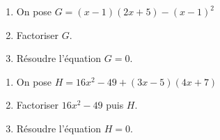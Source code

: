 \begin{multicols}{2}
    \begin{enumerate}
        \item On pose $G=(x-1)(2x+5)-(x-1)^2$
        \item Factoriser $G$.
        \item Résoudre l'équation $G=0$.
    \end{enumerate}

    \begin{enumerate}
        \item On pose $H=16x^2-49+(3x-5)(4x+7)$
        \item Factoriser $16x^2-49$ puis $H$.
        \item Résoudre l'équation $H=0$.
    \end{enumerate}
\end{multicols}